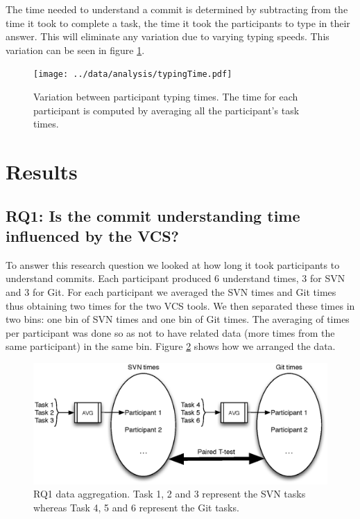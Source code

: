 \documentclass[letterpaper]{article}
\begin{document}
The time needed to understand a commit is determined by subtracting from the time it took to complete a task, the time it took the participants to type in their answer.
This will eliminate any variation due to varying typing speeds.
This variation can be seen in figure \ref{fig:typingTimes}.

\begin{figure}[H]
    \centering
    \texttt{[image: ../data/analysis/typingTime.pdf]}
    \caption{Variation between participant typing times. The time for each participant is computed by averaging all the participant's task times.}
    \label{fig:typingTimes}
\end{figure}

\section{Results}

\subsection{RQ1: Is the commit understanding time influenced by the VCS?}

To answer this research question we looked at how long it took participants to understand commits.
Each participant produced 6 understand times, 3 for SVN and 3 for Git.
For each participant we averaged the SVN times and Git times thus obtaining two times for the two VCS tools.
We then separated these times in two bins: one bin of SVN times and one bin of Git times. 
The averaging of times per participant was done so as not to have related data (more times from the same participant) in the same bin.
Figure \ref{fig:rq1-data} shows how we arranged the data.

\begin{figure}[H]
    \centering
    \includegraphics[width=1\textwidth]{fig/RQ1-data}
    \caption{RQ1 data aggregation. Task 1, 2 and 3 represent the SVN tasks whereas Task 4, 5 and 6 represent the Git tasks.}
    \label{fig:rq1-data}
\end{figure}
\end{document}
